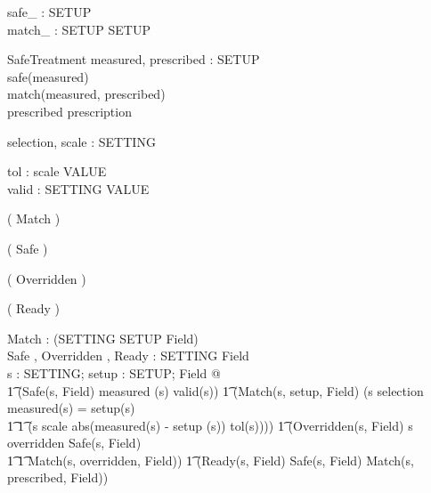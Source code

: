 \documentclass{llncs}
\begin{document}
\begin{axdef}
safe\_ : \power SETUP \\
match\_ : SETUP \rel SETUP
\end{axdef}

\begin{schema}{SafeTreatment}
measured, prescribed : SETUP \\
\where safe(measured) \\
match(measured, prescribed) \\
prescribed \in \ran prescription
\end{schema}

\begin{axdef}
selection, scale : \power SETTING
\end{axdef}

\begin{axdef}
tol : scale \fun VALUE \\
valid : SETTING \fun \power VALUE
\end{axdef}

\begin{zed}
  \relation ( Match \varg )
\end{zed}

\begin{zed}
  \relation ( Safe \varg )
\end{zed}

\begin{zed}
  \relation ( Overridden \varg )
\end{zed}

\begin{zed}
  \relation ( Ready \varg )
\end{zed}

\begin{axdef}
Match \varg : \power(SETTING \cross SETUP \cross Field) \\
Safe \varg, Overridden \varg, Ready \varg : SETTING \rel Field \\
\where \forall s : SETTING; setup : SETUP; Field @ \\
\t1 (Safe(s, \theta Field) \iff measured (s) \in valid(s)) \land
\also
\t1 (Match(s, setup, \theta Field) \iff (s \in selection \land
measured(s) = setup(s) \lor \\
\t1 \t1 (s \in scale \land abs(measured(s) - setup (s)) \leq
tol(s))))\land
\also
\t1 (Overridden(s, \theta Field) \iff s \in \dom overridden \land
Safe(s, \theta Field) \land \\
\t1 \t1 Match(s, overridden, \theta Field)) \land
\also
\t1 (Ready(s, \theta Field) \iff Safe(s, \theta Field) \land
Match(s, prescribed, \theta Field))
\end{axdef}
\end{document}
